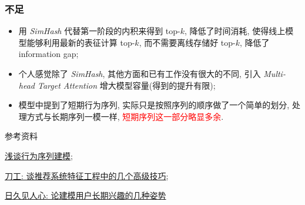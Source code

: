 \subsubsection{不足}
\begin{itemize}
	\item 用 \textit{SimHash} 代替第一阶段的内积来得到 top-$k$, 降低了时间消耗, 使得线上模型能够利用最新的表征计算 top-$k$, 而不需要离线存储好 top-$k$, 降低了 information gap;
	\vskip5pt
	
	\item 个人感觉除了 \textit{SimHash}, 其他方面和已有工作没有很大的不同, 引入 \textit{Multi-head Target Attention} 增大模型容量(得到的提升有限);
	\vskip5pt 
	
	\item 模型中提到了短期行为序列, 实际只是按照序列的顺序做了一个简单的划分, 处理方式与长期序列一模一样, \textcolor{red}{短期序列这一部分略显多余}.
\end{itemize}

参考资料
\begin{myitemize}
	\item \href{https://mp.weixin.qq.com/s?__biz=MzU0MDA1MzI0Mw==&mid=2247488129&idx=1&sn=ed882611a06b75e8e819b519010e9e81&chksm=fb3e4915cc49c003cb4505d0b09f06fa1c4e92409270b49f5509f1902774234382ba05b400d8&scene=21#wechat_redirect}{浅谈行为序列建模};
	
	\item \href{https://mp.weixin.qq.com/s?__biz=MzI5NTU2ODQzMg==&mid=2247484150&idx=1&sn=3bdb017a542bc2e2b94404f46ec9eb4f&chksm=ec50d7a9db275ebfdc009e6be3ea6a0ee8209477dafc99bc8a6a212fa0456a14bf4453b826dd&scene=21#wechat_redirect}{刀工: 谈推荐系统特征工程中的几个高级技巧};
	
	\item \href{https://mp.weixin.qq.com/s/o04b8gN4TYecKHopXGMuVg}{日久见人心: 论建模用户长期兴趣的几种姿势}
\end{myitemize}